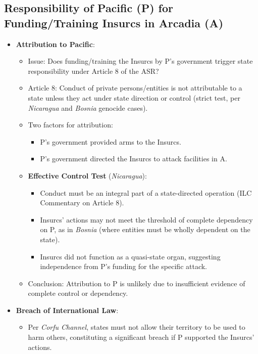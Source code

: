 \subsection{Responsibility of Pacific (P) for Funding/Training Insurcs in Arcadia (A)}
\begin{itemize}
    \item \textbf{Attribution to Pacific}:
    \begin{itemize}
        \item Issue: Does funding/training the Insurcs by P’s government trigger state responsibility under Article 8 of the ASR?
        \item Article 8: Conduct of private persons/entities is not attributable to a state unless they act under state direction or control (strict test, per \textit{Nicaragua} and \textit{Bosnia} genocide cases).
        \item Two factors for attribution:
        \begin{itemize}
            \item P’s government provided arms to the Insurcs.
            \item P’s government directed the Insurcs to attack facilities in A.
        \end{itemize}
        \item \textbf{Effective Control Test} (\textit{Nicaragua}):
        \begin{itemize}
            \item Conduct must be an integral part of a state-directed operation (ILC Commentary on Article 8).
            \item Insurcs’ actions may not meet the threshold of complete dependency on P, as in \textit{Bosnia} (where entities must be wholly dependent on the state).
            \item Insurcs did not function as a quasi-state organ, suggesting independence from P’s funding for the specific attack.
        \end{itemize}
        \item Conclusion: Attribution to P is unlikely due to insufficient evidence of complete control or dependency.
    \end{itemize}
    \item \textbf{Breach of International Law}:
    \begin{itemize}
        \item Per \textit{Corfu Channel}, states must not allow their territory to be used to harm others, constituting a significant breach if P supported the Insurcs’ actions.

\end{itemize}
\end{itemize}
